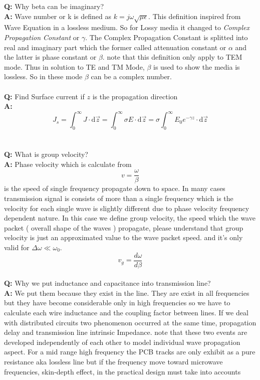 \textbf{Q:} Why beta can be imaginary?\\
\textbf{A:} Wave number or k is defined as $ k = j \omega \sqrt{\mu \epsilon} $. This definition inspired from Wave Equation in a lossless medium. So for Lossy media it changed to {\it Complex Propagation Constant} or $\gamma$.  The Complex Propagation Constant is splitted into real and imaginary part which the former called attenuation constant or $\alpha$ and the latter is phase constant or $\beta$. note that this definition only apply to TEM mode. Thus in solution to TE and TM Mode, $\beta$ is used to show the media is lossless. So in these mode $\beta$ can be a complex number.
\\\\\textbf{Q:} Find Surface current if $z$ is the propagation direction\\
\textbf{A:} 
$$ J_s =  \int_{0}^{\infty}{ J } \cdot \mathrm{d}\vec{z} = \int_{0}^{\infty}{\sigma E} \cdot \mathrm{d}\vec{z} = \sigma \int_{0}^{\infty}{E_0 e^{-\gamma z}} \cdot \mathrm{d}\vec{z} $$
\\\\\textbf{Q:} What is group velocity?\\
\textbf{A:} Phase velocity which is calculate from\\
$$ v = \frac{\omega}{\beta} $$
is the speed of single frequency propagate down to space. In many cases transmission signal is consists of more than a single frequency which is the velocity for each single wave is slightly different due to phase velocity frequency dependent nature. In this case we define group velocity, the speed which the wave packet ( overall shape of the waves ) propagate, please understand that group velocity is just an approximated value to the wave packet speed. and it's only valid for $\Delta \omega \ll \omega_{0}$.\\
$$ v_g = \frac{d\omega}{d\beta} $$
\\\textbf{Q:} Why we put inductance and capacitance into transmission line?\\
\textbf{A:} We put them because they exist in the line. They are exist in all frequencies but they have become considerable only in high frequencies so we have to calculate each wire inductance and the coupling factor between lines. If we deal with distributed circuits two phenomenon occurred at the same time, propagation delay and transmission line intrinsic Impedance. note that these two events are developed independently of each other to model individual wave propagation aspect.
For a mid range high frequency the PCB tracks are only exhibit as a pure resistance aka lossless line but if the frequency move toward microwave frequencies, skin-depth effect, in the practical design must take into accounts
